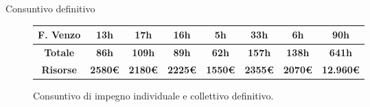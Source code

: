 \documentclass{beamer}
\begin{document}
\begin{frame}[shrink=17]{Consuntivo definitivo}
\begin{figure}
\begin{tabular}{|c|c|c|c|c|c|c|c|}
      \hline
      \cellcolor{aziendaPrimary!20} F. Venzo     & 13h                                           & 17h                                           & 16h            & 5h             & 33h            & 6h             & \textbf{90h}     \\
      \hline
      \cellcolor{aziendaPrimary!20}
      \textbf{Totale}                            & \textbf{86h}                                  & \textbf{109h}                                 & \textbf{89h}   & \textbf{62h}   & \textbf{157h}  & \textbf{138h}  & \textbf{641h}    \\
      \hline
      \cellcolor{aziendaPrimary!20}
      \textbf{Risorse}                           & \textbf{2580€}                                & \textbf{2180€}                                & \textbf{2225€} & \textbf{1550€} & \textbf{2355€} & \textbf{2070€} & \textbf{12.960€} \\
      \hline
    \end{tabular}
    \caption{Consuntivo di impegno individuale e collettivo definitivo.}
    \end{figure}
\end{frame}
\end{document}
